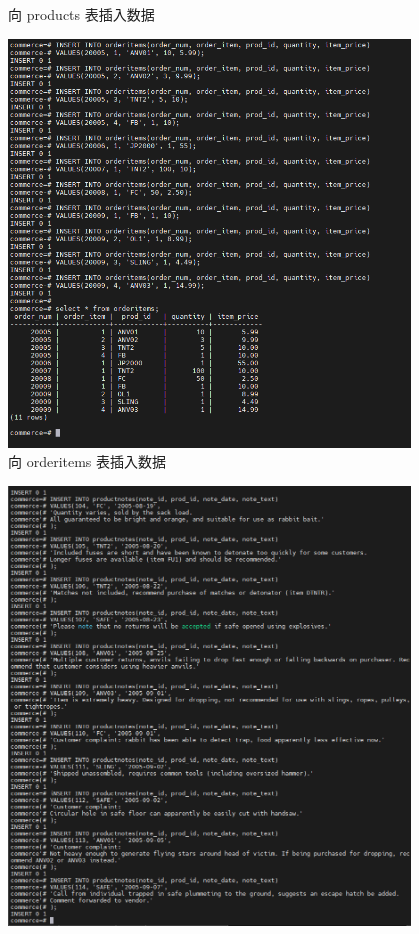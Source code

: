 \begin{enumerate}
\begin{figure}[H]
\begin{center}
  \end{center}
  \caption{向 products 表插入数据}
\end{figure}
\begin{figure}[H]
  \begin{center}
    \includegraphics[width=0.95\textwidth,scale=0.5]{./figures/insert_table_orderitems.png}
  \end{center}
  \caption{向 orderitems 表插入数据}
\end{figure}
\begin{figure}[H]
  \begin{center}
    \includegraphics[width=0.95\textwidth,scale=0.5]{./figures/insert_table_productnotes.png}

\end{center}
\end{figure}
\end{enumerate}

